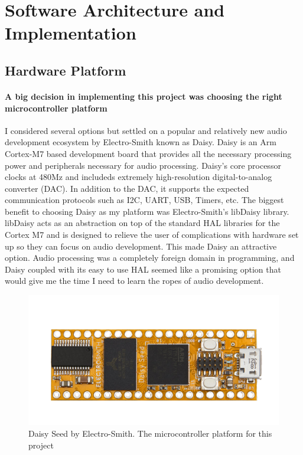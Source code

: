 \documentclass[acmlarge,screen]{acmart}
\begin{document}
\section{Software Architecture and Implementation}

\subsection{Hardware Platform}
	\paragraph{A big decision in implementing this project was choosing the right microcontroller platform} I considered several options but settled on a popular and relatively new audio development ecosystem by Electro-Smith known as Daisy. Daisy is an Arm Cortex-M7 based development board that provides all the necessary processing power and peripherals necessary for audio processing. Daisy's core processor clocks at 480Mz and includeds extremely high-resolution digital-to-analog converter (DAC). In addition to the DAC, it supports the expected communication protocols such as I2C, UART, USB, Timers, etc. The biggest benefit to choosing Daisy as my platform was Electro-Smith's libDaisy library. libDaisy acts as an abstraction on top of the standard HAL libraries for the Cortex M7 and is designed to relieve the user of complications with hardware set up so they can focus on audio development. \cite{electro-smith} This made Daisy an attractive option. Audio processing was a completely foreign domain in programming, and Daisy coupled with its easy to use HAL seemed like a promising option that would give me the time I need to learn the ropes of audio development.
	
	\begin{figure}
		\includegraphics[width=\linewidth]{daisy_promo_pic}
		\caption{Daisy Seed by Electro-Smith. The microcontroller platform for this project}
		\centering
	\end{figure}
\end{document}
